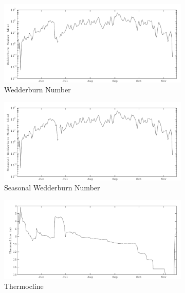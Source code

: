 	\begin{figure}
		\ContinuedFloat\centering\captionsetup{list=no}
		\begin{subfigure}{\lafigsize}
			\caption{Wedderburn Number}
			\includegraphics[width=\textwidth]{figures/Sparkling_W.pdf}
		\end{subfigure}
		\begin{subfigure}{\lafigsize}
			\caption{Seasonal Wedderburn Number}
			\includegraphics[width=\textwidth]{figures/Sparkling_SW.pdf}
		\end{subfigure}
		\begin{subfigure}{\lafigsize}
			\caption{Thermocline}
			\includegraphics[width=\textwidth]{figures/Sparkling_thermD.pdf}
		\end{subfigure}
		\begin{subfigure}{\lafigsize}

\end{subfigure}
\end{figure}
